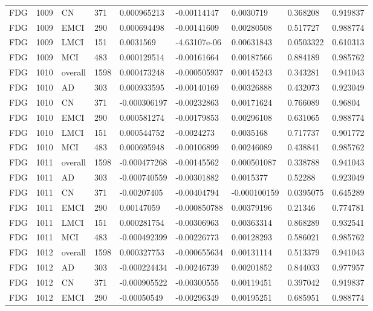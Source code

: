 \begin{landscape}
\begin{longtable}{lllllllll}
FDG & 1009 & CN & 371 & 0.000965213 & -0.00114147 & 0.0030719 & 0.368208 & 0.919837 \\
FDG & 1009 & EMCI & 290 & 0.000694498 & -0.00141609 & 0.00280508 & 0.517727 & 0.988774 \\
FDG & 1009 & LMCI & 151 & 0.0031569 & -4.63107e-06 & 0.00631843 & 0.0503322 & 0.610313 \\
FDG & 1009 & MCI & 483 & 0.000129514 & -0.00161664 & 0.00187566 & 0.884189 & 0.985762 \\
FDG & 1010 & overall & 1598 & 0.000473248 & -0.000505937 & 0.00145243 & 0.343281 & 0.941043 \\
FDG & 1010 & AD & 303 & 0.000933595 & -0.00140169 & 0.00326888 & 0.432073 & 0.923049 \\
FDG & 1010 & CN & 371 & -0.000306197 & -0.00232863 & 0.00171624 & 0.766089 & 0.96804 \\
FDG & 1010 & EMCI & 290 & 0.000581274 & -0.00179853 & 0.00296108 & 0.631065 & 0.988774 \\
FDG & 1010 & LMCI & 151 & 0.000544752 & -0.0024273 & 0.0035168 & 0.717737 & 0.901772 \\
FDG & 1010 & MCI & 483 & 0.000695948 & -0.00106899 & 0.00246089 & 0.438841 & 0.985762 \\
FDG & 1011 & overall & 1598 & -0.000477268 & -0.00145562 & 0.000501087 & 0.338788 & 0.941043 \\
FDG & 1011 & AD & 303 & -0.000740559 & -0.00301882 & 0.0015377 & 0.52288 & 0.923049 \\
FDG & 1011 & CN & 371 & -0.00207405 & -0.00404794 & -0.000100159 & 0.0395075 & 0.645289 \\
FDG & 1011 & EMCI & 290 & 0.00147059 & -0.000850788 & 0.00379196 & 0.21346 & 0.774781 \\
FDG & 1011 & LMCI & 151 & 0.000281754 & -0.00306963 & 0.00363314 & 0.868289 & 0.932541 \\
FDG & 1011 & MCI & 483 & -0.000492399 & -0.00226773 & 0.00128293 & 0.586021 & 0.985762 \\
FDG & 1012 & overall & 1598 & 0.000327753 & -0.000655634 & 0.00131114 & 0.513379 & 0.941043 \\
FDG & 1012 & AD & 303 & -0.000224434 & -0.00246739 & 0.00201852 & 0.844033 & 0.977957 \\
FDG & 1012 & CN & 371 & -0.000905522 & -0.00300555 & 0.00119451 & 0.397042 & 0.919837 \\
FDG & 1012 & EMCI & 290 & -0.00050549 & -0.00296349 & 0.00195251 & 0.685951 & 0.988774 \\

\end{longtable}
\end{landscape}
